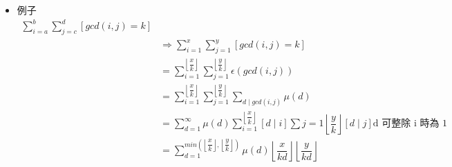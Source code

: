 \begin{itemize}
\item 例子
$$ \begin{aligned}
    \sum_{i = a}^{b} \sum_{j = c}^{d} [gcd(i, j) = k]\\
    &\Rightarrow \sum_{i = 1}^{x} \sum_{j = 1}^{y} [gcd(i, j) = k]\\
    &= \sum_{i = 1}^{\left\lfloor\dfrac {x}{k} \right\rfloor} \sum_{j = 1}^{\left\lfloor\dfrac {y}{k} \right\rfloor} \epsilon(gcd(i, j))\\
    &= \sum_{i = 1}^{\left\lfloor\dfrac {x}{k} \right\rfloor} \sum_{j = 1}^{\left\lfloor\dfrac {y}{k} \right\rfloor} \sum_{d \mid gcd(i, j)} \mu(d)\\
    &= \sum_{d = 1}^{\infty} \mu(d) \sum_{i = 1}^{\left\lfloor\dfrac {x}{k} \right\rfloor} [d \mid i] \sum {j = 1}{\left\lfloor\dfrac {y}{k} \right\rfloor} [d \mid j] \text{d 可整除 i 時為 1}\\
    &= \sum_{d = 1}^{min(\left\lfloor\dfrac {x}{k} \right\rfloor, \left\lfloor\dfrac {y}{k} \right\rfloor)} \mu(d) \left\lfloor\dfrac {x}{kd} \right\rfloor \left\lfloor\dfrac {y}{kd} \right\rfloor
\end{aligned} $$
\end{itemize}